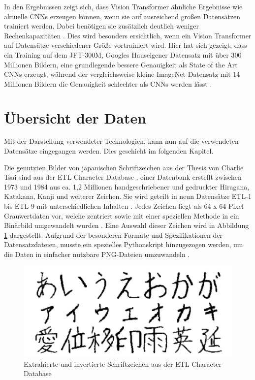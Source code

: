 \documentclass[twoside,a4paper]{IEEEtran}
\begin{document}
In den Ergebnissen zeigt sich, dass Vision Transformer ähnliche Ergebnisse wie aktuelle CNNs erzeugen können, wenn sie auf ausreichend großen Datensätzen trainiert werden. Dabei benötigen sie zusätzlich deutlich weniger Rechenkapazitäten \cite[S.5]{VIT}. Dies wird besonders ersichtlich, wenn ein Vision Transformer auf Datensätze verschiedener Größe vortrainiert wird. Hier hat sich gezeigt, dass ein Training auf dem JFT-300M, Googles Hauseigener Datensatz mit über 300 Millionen Bildern, eine grundlegende bessere Genauigkeit als State of the Art CNNs erzeugt, während der vergleichsweise kleine ImageNet Datensatz mit 14 Millionen Bildern \cite{IMAGENET} die Genauigkeit schlechter als CNNs werden lässt \cite{JFT}.
\section{Übersicht der Daten} %
Mit der Darstellung verwendeter Technologien, kann nun auf die verwendeten Datensätze eingegangen werden. Dies geschieht im folgenden Kapitel.

Die genutzten Bilder von japanischen Schriftzeichen aus der Thesis von Charlie Tsai sind aus der ETL Character Database \cite[S.2-3]{RHC}, einer Datenbank erstellt zwischen 1973 und 1984 aus ca. 1,2 Millionen handgeschriebener und gedruckter Hiragana, Katakana, Kanji und weiterer Zeichen. Sie wird geteilt in neun Datensätze ETL-1 bis ETL-9 mit unterschiedlichen Inhalten \cite{ETL}. Jedes Zeichen liegt als 64 x 64 Pixel Grauwertdaten vor, welche zentriert sowie mit einer speziellen Methode in ein Binärbild umgewandelt wurden \cite[S.3]{RHC}. Eine Auswahl dieser Zeichen wird in Abbildung \ref{kana} dargestellt. Aufgrund der besonderen Formate und Spezifikationen der Datensatzdateien, musste ein spezielles Pythonskript hinzugezogen werden, um die Daten in einfacher nutzbare PNG-Dateien umzuwandeln \cite{ETL_FORMATS}.
 
\begin{figure}[!htb]
	\includegraphics[width=\columnwidth]{kana}
	\caption{Extrahierte und invertierte Schriftzeichen aus der ETL Character Database \cite[S.1]{RHC}}
	\label{kana}
\end{figure}
\end{document}
